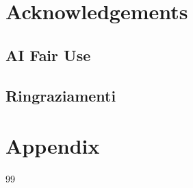\chapter{Acknowledgements}
    \section{AI Fair Use}
    \section{Ringraziamenti}

\appendix
\chapter{Appendix}


\begin{thebibliography}{99}

\end{thebibliography}